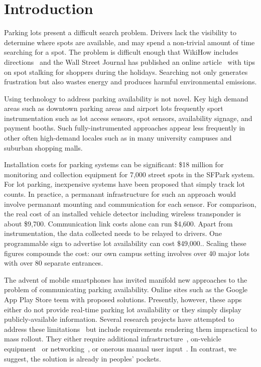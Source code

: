 \section{Introduction}


Parking lots present a difficult search problem. Drivers lack the visibility
to determine where spots are available, and may spend a non-trivial amount of
time searching for a spot. The problem is difficult enough that WikiHow
includes directions~\cite{wikihow-park} and the Wall Street Journal has
published an online article~\cite{wsj-park} with tips on spot stalking for
shoppers during the holidays. Searching not only generates frustration but
also wastes energy and produces harmful environmental emissions.

Using technology to address parking availability is not novel.  Key high
demand areas such as downtown parking areas and airport lots frequently sport
instrumentation such as lot access sensors, spot sensors, availability
signage, and payment booths.  Such fully-instrumented approaches appear less
frequently in other often high-demand locales such as in many university
campuses and suburban shopping malls.

Installation costs for parking systems can be significant:  \$18 million for
monitoring and collection equipment for 7,000 street spots in the SFPark
system.\cite{sf-park}  For lot parking, inexpensive systems have been
proposed that simply track lot counts.\cite{lot-count}  In practice, a
permanant infrastructure for such an approach would involve permanant
mounting and communication for each sensor.  For comparison, the real cost
of an installed vehicle detector including wireless transponder is about
\$9,700.\cite{car-detect}  Communication link costs alone can run
\$4,600.\cite{mstp-park}  Apart from instrumentation, the data collected
needs to be relayed to drivers.  One programmable sign to advertise lot
availability can cost \$49,000.\cite{mstp-park}.  Scaling these figures
compounds the cost:  our own campus setting involves over 40 major lots
with over 80 separate entrances.

The advent of mobile smartphones has invited manifold new approaches to the
problem of communicating parking availability.  Online sites such as the
Google App Play Store teem with proposed solutions.  Presently, however, these
apps either do not provide real-time parking lot availability or they simply
display publicly-available information. Several research projects have
attempted to address these limitations~\cite{4212497, Chen:2012:COS,
Delot:2009:CRP, 5062057, Mathur:2010:PDS} but include requirements rendering
them impractical to mass rollout.  They either require additional
infrastructure~\cite{5062057}, on-vehicle equipment~\cite{Mathur:2010:PDS}
or networking~\cite{Delot:2009:CRP, Mathur:2010:PDS}, or onerous manual user
input~\cite{Chen:2012:COS}. In contrast, we suggest, the solution is already
in peoples' pockets.

